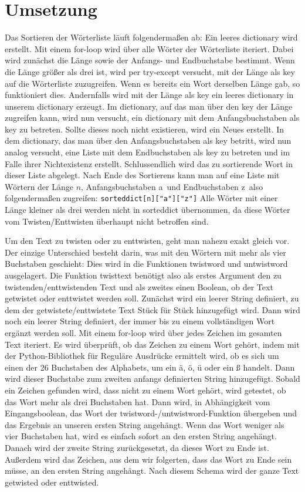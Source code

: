 \documentclass[a4paper,10pt,ngerman]{scrartcl}
\begin{document}
\section{Umsetzung}
Das Sortieren der Wörterliste läuft folgendermaßen ab:
Ein leeres dictionary wird erstellt.
Mit einem for-loop wird über alle Wörter der Wörterliste iteriert. Dabei wird zunächst die Länge sowie der Anfangs- und Endbuchstabe bestimmt. 
Wenn die Länge größer als drei ist, wird per try-except versucht, mit der Länge als key auf die Wörterliste zuzugreifen. Wenn es bereits ein Wort derselben Länge gab, so funktioniert dies. Andernfalls wird mit der Länge als key ein leeres dictionary in unserem dictionary erzeugt. Im dictionary, auf das man über den key der Länge zugreifen kann, wird nun versucht, ein dictionary mit dem Anfangsbuchstaben als key zu betreten. Sollte dieses noch nicht existieren, wird ein Neues erstellt.
In dem dictionary, das man über den Anfangsbuchstaben als key betritt, wird nun analog versucht, eine Liste mit dem Endbuchstaben als key zu betreten und im Falle ihrer Nichtexistenz erstellt. Schlussendlich wird das zu sortierende Wort in dieser Liste abgelegt.
Nach Ende des Sortierens kann man auf eine Liste mit Wörtern der Länge $n$, Anfangsbuchstaben \grqq a\grqq\ und Endbuchstaben \grqq z\grqq\ also folgendermaßen zugreifen: \lstinline|sorteddict[n]["a"]["z"]|
Alle Wörter mit einer Länge kleiner als drei werden nicht in sorteddict übernommen, da diese Wörter vom Twisten/Enttwisten überhaupt nicht betroffen sind.

Um den Text zu twisten oder zu enttwisten, geht man nahezu exakt gleich vor. Der einzige Unterschied besteht darin, was mit den Wörtern mit mehr als vier Buchstaben geschieht: Dies wird in die Funktionen twistword und untwistword ausgelagert. Die Funktion twisttext benötigt also als erstes Argument den zu twistenden/enttwistenden Text und als zweites einen Boolean, ob der Text getwistet oder enttwistet werden soll.
Zunächst wird ein leerer String definiert, zu dem der getwistete/enttwistete Text Stück für Stück hinzugefügt wird.
Dann wird noch ein leerer String definiert, der immer bis zu einem vollständigen Wort ergänzt werden soll.
Mit einem for-loop wird über jedes Zeichen im gesamten Text iteriert.
Es wird überprüft, ob das Zeichen zu einem Wort gehört, indem mit der Python-Bibliothek für Reguläre Ausdrücke ermittelt wird, ob es sich um einen der 26 Buchstaben des Alphabets, um ein ä, ö, ü oder ein ß handelt. Dann wird dieser Buchstabe zum zweiten anfangs definierten String hinzugefügt. Sobald ein Zeichen gefunden wird, dass nicht zu einem Wort gehört, wird getestet, ob das Wort mehr als drei Buchstaben hat. Dann wird, in Abhängigkeit vom Eingangsboolean, das Wort der twistword-/untwistword-Funktion übergeben und das Ergebnis an unseren ersten String angehängt. Wenn das Wort weniger als vier Buchstaben hat, wird es einfach sofort an den ersten String angehängt. Danach wird der zweite String zurückgesetzt, da dieses Wort zu Ende ist. Außerdem wird das Zeichen, aus dem wir folgerten, dass das Wort zu Ende sein müsse, an den ersten String angehängt.
Nach diesem Schema wird der ganze Text getwisted oder enttwisted.
\end{document}
